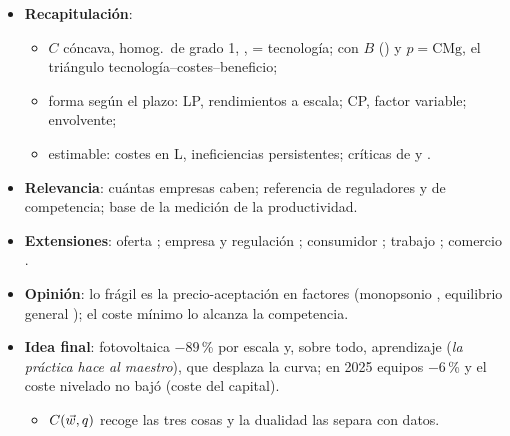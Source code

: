 \documentclass{article}
\begin{document}
\begin{columnas}
\begin{itemize}
\item \textbf{Recapitulación}:
  \begin{itemize}
  \item $C$ cóncava, homog.\ de grado 1, , = tecnología; con $B$ () y $p=\mathrm{CMg}$, el triángulo tecnología--costes--beneficio;
  \item forma según el plazo: LP, rendimientos a escala; CP, factor variable; envolvente;
  \item estimable: costes en L, ineficiencias persistentes; críticas de  y .
  \end{itemize}
\item \textbf{Relevancia}: cuántas empresas caben; referencia de reguladores y de competencia; base de la medición de la productividad.
\item \textbf{Extensiones}: oferta   ; empresa y regulación  ; consumidor ; trabajo ; comercio  .
\item \textbf{Opinión}: lo frágil es la precio-aceptación en factores (monopsonio , equilibrio general ); el coste mínimo lo alcanza la competencia.
\item \textbf{Idea final}: fotovoltaica $-89$\,\% por escala y, sobre todo, aprendizaje (\emph{la práctica hace al maestro}), que desplaza la curva; en 2025 equipos $-6$\,\% y el coste nivelado no bajó (coste del capital).
  \begin{itemize}
  \item $C(\vec{w},q)$ recoge las tres cosas y la dualidad las separa con datos.
  \end{itemize}
\end{itemize}


\end{columnas}
\end{document}
